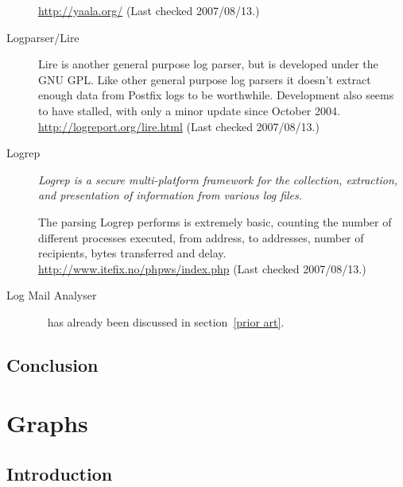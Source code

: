 \documentclass[a4paper,12pt,draft]{article}
\begin{document}
\begin{description}
        \url{http://yaala.org/} \newline (Last checked 2007/08/13.)

    \item [Logparser/Lire] Lire is another general purpose log parser, but
        is developed under the GNU GPL\@.  Like other general purpose log
        parsers it doesn't extract enough data from Postfix logs to be
        worthwhile.  Development also seems to have stalled, with only a
        minor update since October 2004.  \newline
        \url{http://logreport.org/lire.html} \newline (Last checked
        2007/08/13.)

    \item [Logrep] \textit{Logrep is a secure multi-platform framework for
        the collection, extraction, and presentation of information from
        various log files.\/}

        The parsing Logrep performs is extremely basic, counting the number
        of different processes executed, from address, to addresses, number
        of recipients, bytes transferred and delay.  \newline
        \url{http://www.itefix.no/phpws/index.php} \newline (Last checked
        2007/08/13.)

    \item [Log Mail Analyser]~\cite{log-mail-analyser} has already been
        discussed in section~\ref{prior art}.

\end{description}

\subsection{Conclusion}




\label{bibliography}

\section{Graphs}

\label{graphs}

\subsection{Introduction}
\end{document}
